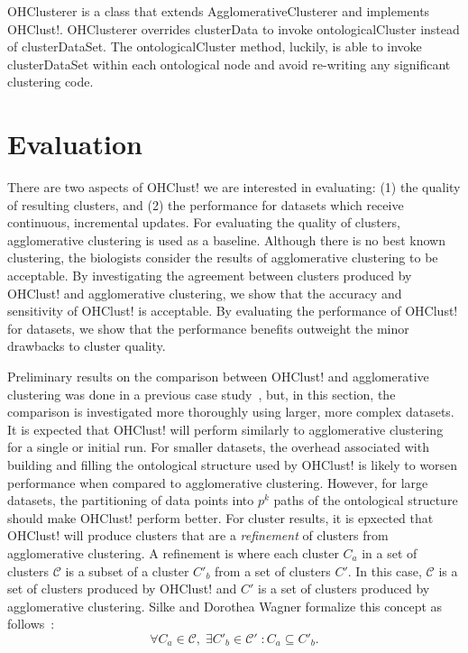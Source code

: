 \documentclass[12pt]{ucthesis}
\begin{document}
      OHClusterer is a class that extends AgglomerativeClusterer and
      implements \textsf{OHClust!}. OHClusterer overrides
      \textsf{clusterData} to invoke \textsf{ontologicalCluster} instead of
      \textsf{clusterDataSet}. The \textsf{ontologicalCluster} method, luckily,
      is able to invoke \textsf{clusterDataSet} within each ontological node
      and avoid re-writing any significant clustering code.

\chapter{Evaluation}\label{chap:evaluation}
   There are two aspects of \textsf{OHClust!} we are interested in evaluating:
   (1) the quality of resulting clusters, and (2) the performance for datasets which
   receive continuous, incremental updates. For evaluating the quality of
   clusters, \textsf{agglomerative clustering} is used as a baseline. Although
   there is no best known clustering, the biologists consider the results of
   \textsf{agglomerative clustering} to be acceptable. By investigating the
   agreement between clusters produced by \textsf{OHClust!} and
   \textsf{agglomerative clustering}, we show that the accuracy and sensitivity
   of \textsf{OHClust!} is acceptable. By evaluating the performance of
   \textsf{OHClust!} for datasets, we show that the performance benefits
   outweight the minor drawbacks to cluster quality.

   Preliminary results on the comparison between \textsf{OHClust!} and
   \textsf{agglomerative clustering} was done in a previous case
   study~\cite{Montana:ChronoCluster}, but, in this section, the comparison is
   investigated more thoroughly using larger, more complex datasets. It is
   expected that \textsf{OHClust!} will perform similarly to
   \textsf{agglomerative clustering} for a single or initial run. For smaller
   datasets, the overhead associated with building and filling the ontological
   structure used by \textsf{OHClust!} is likely to worsen performance when
   compared to \textsf{agglomerative clustering}. However, for large datasets,
   the partitioning of data points into $p^{k}$ paths of the ontological
   structure should make \textsf{OHClust!} perform better. For cluster results,
   it is epxected that \textsf{OHClust!} will produce clusters that are a
   \textit{refinement} of clusters from \textsf{agglomerative clustering}. A
   refinement is where each cluster $C_{a}$ in a set of clusters $\mathcal{C}$ is
   a subset of a cluster $C'_{b}$ from a set of clusters $C'$. In this case,
   $\mathcal{C}$ is a set of clusters produced by \textsf{OHClust!} and $C'$ is
   a set of clusters produced by \textsf{agglomerative clustering}. Silke and
   Dorothea Wagner formalize this concept as follows~\cite{Wagner:Overview}:
   $$
     \forall C_{a} \in \mathcal{C},\;\exists C'_{b} \in \mathcal{C}'\;:
                       C_{a} \subseteq C'_{b}.
   $$
\end{document}
